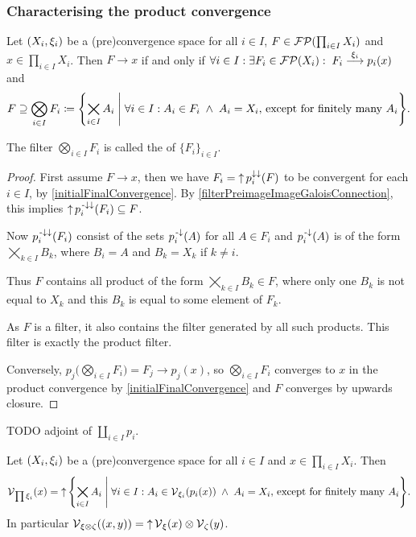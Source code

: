 \subsubsection{Characterising the product convergence}
\begin{proposition} \label{convergenceProductFilter}
Let $\left( X_i, \xi_i \right)$ be a (pre)convergence space for all $i\in I$, $F \in \operatorname{\mathcal{FP}}(\prod_{i\in I}X_i)$ and $x\in \prod_{i\in I}X_i$. Then $F\to x$ \textup{if and only if} $\forall i\in I: \exists F_i\in \operatorname{\mathcal{FP}}(X_i): 
\; F_i \overset{\xi_i}{\longrightarrow} p_i(x)$ and
\[ F \supseteq \bigotimes_{i\in I}F_i \defeq \setbuilder{\bigtimes_{i\in I}A_i}{\forall i\in I: A_i \in F_i \;\land\; A_i = X_i, \,\text{except for finitely many $A_i$}}. \]
\end{proposition}
The filter $\bigotimes_{i\in I}F_i$ is called the  of $\{F_i\}_{i\in I}$.
\begin{proof}
First assume $F\to x$, then we have $F_i = \operatorname{\uparrow} p_i^{\downarrow\downarrow}(F)$ to be convergent for each $i\in I$, by \ref{initialFinalConvergence}. By \ref{filterPreimageImageGaloisConnection}, this implies $\operatorname{\uparrow} p_i^{{\text{\hspace{0.15em}-}\downarrow}\downarrow}(F_i) \subseteq F$.

Now $p_i^{{\text{\hspace{0.15em}-}\downarrow}\downarrow}(F_i)$ consist of the sets $p_i^{\text{\hspace{0.15em}-}\downarrow}(A)$ for all $A\in F_i$ and $p_i^{\text{\hspace{0.15em}-}\downarrow}(A)$ is of the form $\bigtimes_{k\in I}B_k$, where $B_i = A$ and $B_k = X_k$ if $k \neq i$.

Thus $F$ contains all product of the form $\bigtimes_{k\in I}B_k \in F$, where only one $B_k$ is not equal to $X_k$ and this $B_k$ is equal to some element of $F_k$.

As $F$ is a filter, it also contains the filter generated by all such products. This filter is exactly the product filter.

Conversely, $p_j\Big(\bigotimes_{i\in I}F_i\Big) = F_j \to p_j(x)$, so $\bigotimes_{i\in I}F_i$ converges to $x$ in the product convergence by \ref{initialFinalConvergence} and $F$ converges by upwards closure.
\end{proof}
TODO adjoint of $\coprod_{i\in I}p_i$.
\begin{corollary} \label{productVicinity}
Let $\left( X_i, \xi_i \right)$ be a (pre)convergence space for all $i\in I$ and $x\in \prod_{i\in I}X_i$. Then
\[\vicinity_{\prod \xi_i}(x) = \upset \setbuilder{\bigtimes_{i\in I}A_i}{\forall i\in I: A_i \in \vicinity_{\xi_i}(p_i(x)) \;\land\; A_i = X_i, \,\text{except for finitely many $A_i$}}. \]
In particular $\operatorname{\mathcal{V}}_{\xi\otimes \zeta}((x,y)) = \operatorname{\uparrow} \operatorname{\mathcal{V}}_\xi(x)\otimes \operatorname{\mathcal{V}}_\zeta(y)$.
\end{corollary}

